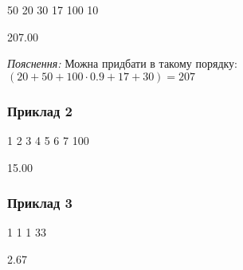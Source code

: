 \documentclass[12pt,a4paper]{article}
\begin{document}
\textbf{}

\begin{codeblock}
50 20 30 17 100
10
\end{codeblock}

\textbf{}

\begin{codeblock}
207.00
\end{codeblock}
\emph{Пояснення:} Можна придбати в такому порядку: \((20 + 50 + 100\cdot0.9 + 17 + 30) = 207\)


\subsubsection*{Приклад 2}

\textbf{}

\begin{codeblock}
1 2 3 4 5 6 7
100
\end{codeblock}

\textbf{}

\begin{codeblock}
15.00
\end{codeblock}


\subsubsection*{Приклад 3}

\textbf{}

\begin{codeblock}
1 1 1
33
\end{codeblock}

\textbf{}

\begin{codeblock}
2.67
\end{codeblock}
\end{document}
